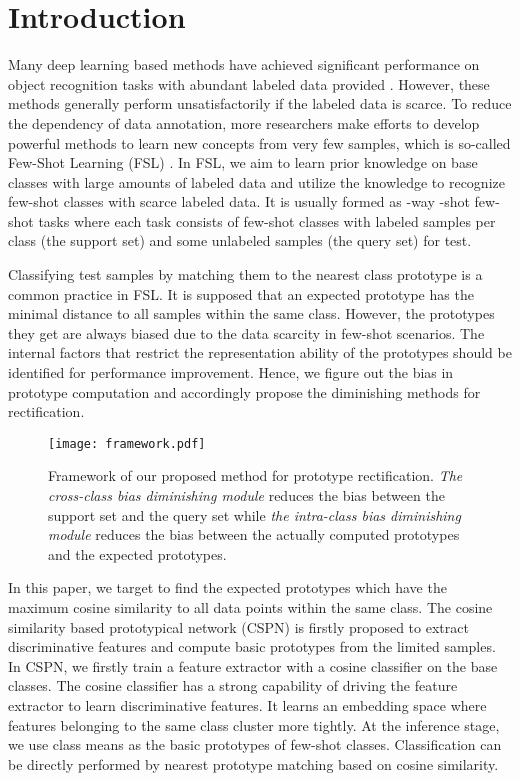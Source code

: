 \documentclass[runningheads]{llncs}
\begin{document}
\section{Introduction}
Many deep learning based methods have achieved significant performance on object recognition tasks with abundant labeled data provided \cite{krizhevsky2012imagenet,russakovsky2015imagenet,he2016deep}. However, these methods generally perform unsatisfactorily if the labeled data is scarce. To reduce the dependency of data annotation, more researchers make efforts to develop powerful methods to learn new concepts from very few samples, which is so-called Few-Shot Learning (FSL) \cite{miller2000learning,fei-fei2006one,vinyals2016matching}. In FSL, we aim to learn prior knowledge on base classes with large amounts of labeled data and utilize the knowledge to recognize few-shot classes with scarce labeled data. It is usually formed as -way -shot few-shot tasks where each task consists of  few-shot classes with  labeled samples per class (the support set) and some unlabeled samples (the query set) for test. 

Classifying test samples by matching them to the nearest class prototype \cite{snell2017prototypical} is a common practice in FSL.
It is supposed that an expected prototype has the minimal distance to all samples within the same class. However, the prototypes they get are always biased due to the data scarcity in few-shot scenarios. The internal factors that restrict the representation ability of the prototypes should be identified for performance improvement. Hence, we figure out the bias in prototype computation and accordingly propose the diminishing methods for rectification.



\begin{figure*}
\centering
\texttt{[image: framework.pdf]}
\caption{Framework of our proposed method for prototype rectification. \textit{The cross-class bias diminishing module} reduces the bias between the support set and the query set while \textit{the intra-class bias diminishing module} reduces the bias between the actually computed prototypes and the expected prototypes.}
\label{Framework}
\end{figure*}


In this paper, we target to find the expected prototypes which have the maximum cosine similarity to all data points within the same class. The cosine similarity based prototypical network (CSPN) is firstly proposed to extract discriminative features and compute basic prototypes from the limited samples. In CSPN, we firstly train a feature extractor with a cosine classifier on the base classes. The cosine classifier has a strong capability of driving the feature extractor to learn discriminative features. It learns an embedding space where features belonging to the same class cluster more tightly. At the inference stage, we use class means as the basic prototypes of few-shot classes. Classification can be directly performed by nearest prototype matching based on cosine similarity.
\end{document}
